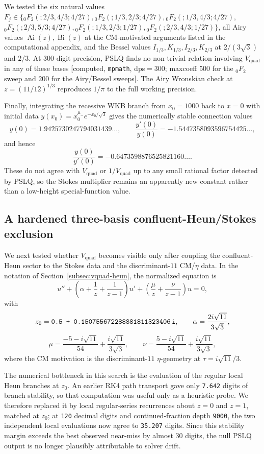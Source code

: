 \documentclass[11pt,a4paper]{article}
\theoremstyle{definition}
\theoremstyle{remark}
\begin{document}
We tested the six natural values
$F_j\in\{{}_0F_2(;2/3,4/3;4/27),{}_0F_2(;1/3,2/3;4/27),{}_0F_2(;1/3,4/3;4/27),$
${}_0F_2(;2/3,5/3;4/27),{}_0F_2(;1/3,2/3;1/27),{}_0F_2(;2/3,4/3;1/27)\}$,
all Airy values $\operatorname{Ai}(z),\operatorname{Bi}(z)$ at the CM-motivated
arguments listed in the computational appendix, and the Bessel values
$I_{1/3},K_{1/3},I_{2/3},K_{2/3}$ at $2/(3\sqrt{3})$ and $2/3$.
At 300-digit precision, PSLQ finds no non-trivial relation involving
$V_{\mathrm{quad}}$ in any of these bases
[computed, \texttt{mpmath}, dps$=300$; maxcoeff $500$ for the
${}_0F_2$ sweep and $200$ for the Airy/Bessel sweeps].
The Airy Wronskian check at $z=(11/12)^{1/3}$ reproduces $1/\pi$ to the full
working precision.

Finally, integrating the recessive WKB branch from $x_0=1000$ back to $x=0$
with initial data $y(x_0)=x_0^{\mu_-}e^{-x_0/\sqrt{3}}$ gives the numerically
stable connection values
\[
  y(0)=1.9425730247794031439\ldots,
  \qquad
  \frac{y'(0)}{y(0)}=-1.5447358093596754425\ldots,
\]
and hence
\[
  \frac{y(0)}{y'(0)}=-0.6473598876525821160\ldots.
\]
These do not agree with $V_{\mathrm{quad}}$ or $1/V_{\mathrm{quad}}$ up to any
small rational factor detected by PSLQ, so the Stokes multiplier remains an
apparently new constant rather than a low-height special-function value.

\subsection{A hardened three-basis confluent-Heun/Stokes exclusion}\label{subsec:vquad-heun-three-basis}

We next tested whether $V_{\mathrm{quad}}$ becomes visible only after coupling
the confluent-Heun sector to the Stokes data and the discriminant-$11$
CM/$\eta$ data.  In the notation of
Section~\ref{subsec:vquad-heun}, the normalized equation is
\[
  u'' + \left(\alpha + \frac1z + \frac1{z-1}\right)u'
  + \left(\frac{\mu}{z} + \frac{\nu}{z-1}\right)u = 0,
\]
with
\[
  z_0 = \texttt{0.5 + 0.150755672288881811323406\,i},
  \qquad
  \alpha = \frac{2i\sqrt{11}}{3\sqrt{3}},
\]
\[
  \mu = \frac{-5-i\sqrt{11}}{54} + \frac{i\sqrt{11}}{3\sqrt{3}},
  \qquad
  \nu = \frac{5-i\sqrt{11}}{54} + \frac{i\sqrt{11}}{3\sqrt{3}},
\]
where the CM motivation is the discriminant-$11$ $\eta$-geometry at
$\tau=i\sqrt{11}/3$.

The numerical bottleneck in this search is the evaluation of the regular local
Heun branches at $z_0$.  An earlier RK4 path transport gave only
\texttt{7.642} digits of branch stability, so that computation was useful only
as a heuristic probe.  We therefore replaced it by local regular-series
recurrences about $z=0$ and $z=1$, matched at $z_0$; at
\texttt{120} decimal digits and continued-fraction depth \texttt{9000}, the two
independent local evaluations now agree to \texttt{35.207} digits.  Since this
stability margin exceeds the best observed near-miss by almost $30$ digits, the
null PSLQ output is no longer plausibly attributable to solver drift.
\end{document}

